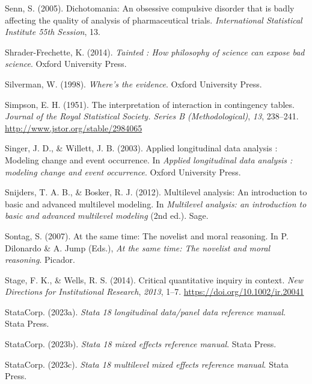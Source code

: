 \documentclass[
  letterpaper,
  DIV=11,
  numbers=noendperiod]{scrreprt}
\newlength{\cslhangindent}
\newenvironment{CSLReferences}[2] %
 {\begin{list}{}{%
  \setlength{\itemindent}{0pt}
  \setlength{\leftmargin}{0pt}
  \setlength{\parsep}{0pt}
  \ifodd #1
   \setlength{\leftmargin}{\cslhangindent}
   \setlength{\itemindent}{-1\cslhangindent}
  \fi
  \setlength{\itemsep}{#2\baselineskip}}}
 {\end{list}}
\begin{document}
\begin{CSLReferences}{1}{0}
Senn, S. (2005). Dichotomania: An obsessive compulsive disorder that is
badly affecting the quality of analysis of pharmaceutical trials.
\emph{International Statistical Institute 55th Session}, 13.

Shrader-Frechette, K. (2014). \emph{Tainted : How philosophy of science
can expose bad science}. Oxford University Press.

Silverman, W. (1998). \emph{Where's the evidence}. Oxford University
Press.

Simpson, E. H. (1951). The interpretation of interaction in contingency
tables. \emph{Journal of the Royal Statistical Society. Series B
(Methodological)}, \emph{13}, 238--241.
\url{http://www.jstor.org/stable/2984065}

Singer, J. D., \& Willett, J. B. (2003). Applied longitudinal data
analysis : Modeling change and event occurrence. In \emph{Applied
longitudinal data analysis : modeling change and event occurrence}.
Oxford University Press.

Snijders, T. A. B., \& Bosker, R. J. (2012). Multilevel analysis: An
introduction to basic and advanced multilevel modeling. In
\emph{Multilevel analysis: an introduction to basic and advanced
multilevel modeling} (2nd ed.). Sage.

Sontag, S. (2007). At the same time: The novelist and moral reasoning.
In P. Dilonardo \& A. Jump (Eds.), \emph{At the same time: The novelist
and moral reasoning}. Picador.

Stage, F. K., \& Wells, R. S. (2014). Critical quantitative inquiry in
context. \emph{New Directions for Institutional Research}, \emph{2013},
1--7. \url{https://doi.org/10.1002/ir.20041}

StataCorp. (2023a). \emph{Stata 18 longitudinal data/panel data
reference manual}. Stata Press.

StataCorp. (2023b). \emph{Stata 18 mixed effects reference manual}.
Stata Press.

StataCorp. (2023c). \emph{Stata 18 multilevel mixed effects reference
manual}. Stata Press.


\end{CSLReferences}
\end{document}
